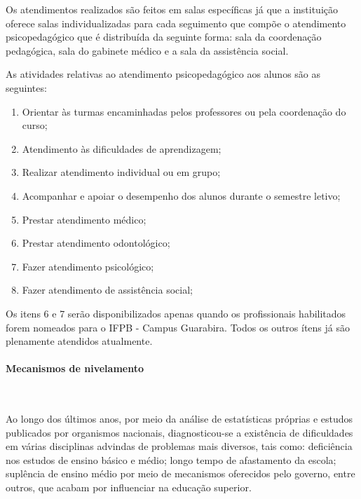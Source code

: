 
       Os atendimentos realizados são feitos em salas específicas já que a instituição oferece salas individualizadas para cada seguimento que compõe o atendimento psicopedagógico que é distribuída da seguinte forma: sala da coordenação pedagógica, sala do gabinete médico e a sala da assistência social. 

       As atividades relativas ao atendimento psicopedagógico aos alunos são as seguintes:

\begin{enumerate}
\item Orientar às turmas encaminhadas pelos professores ou pela coordenação do curso; 
\item Atendimento às dificuldades de aprendizagem;
\item Realizar atendimento individual ou em grupo;
\item Acompanhar e apoiar o desempenho dos alunos durante o semestre letivo;
\item Prestar atendimento médico;
\item Prestar atendimento odontológico;
\item Fazer atendimento psicológico;
\item Fazer atendimento de assistência social;
\end{enumerate}

Os itens 6 e 7 ser\~ao disponibilizados apenas quando os profissionais habilitados forem nomeados para o IFPB - Campus Guarabira. Todos os outros \'itens j\'a s\~ao plenamente atendidos atualmente.

\paragraph{Mecanismos de nivelamento}\

Ao longo dos últimos anos, por meio da análise de estatísticas próprias e estudos publicados por organismos nacionais, diagnosticou-se a existência de dificuldades em várias disciplinas advindas de problemas mais diversos, tais como: deficiência nos estudos de ensino básico e médio; longo tempo de afastamento da escola; suplência de ensino médio por meio de mecanismos oferecidos pelo governo, entre outros, que acabam por influenciar na educação superior.

